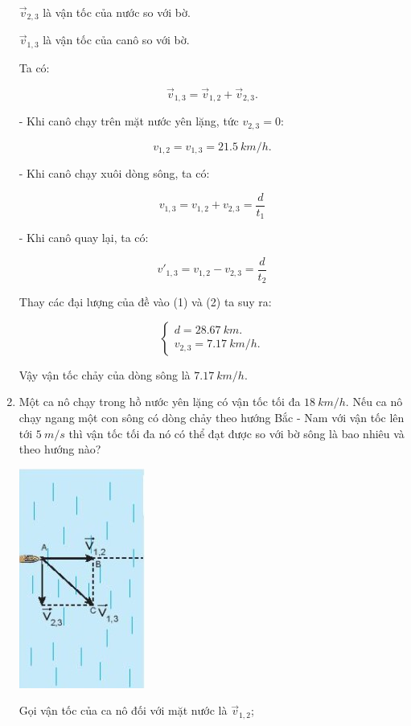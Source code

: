 \begin{enumerate}[label=\bfseries Bài \arabic*:,leftmargin=1.5cm]
{		
		$\vec v_{2,3}$ là vận tốc của nước so với bờ.
		
		
		$\vec v_{1,3}$ là vận tốc của canô so với bờ.
		
		Ta có:
		
		$$\vec v_{1,3} = \vec v_{1,2} + \vec v_{2,3}.$$
		
		- Khi canô chạy trên mặt nước yên lặng, tức $v_{2,3} = 0$:
		
		
		$$v_{1,2} = v_{1,3} = \SI{21,5}{km/h}.$$
		
		- Khi canô chạy xuôi dòng sông, ta có:
		
		$$v_{1,3} = v_{1,2} + v_{2,3} =\dfrac{d}{t_1}$$
		
		- Khi canô quay lại, ta có:
		
		$$v'_{1,3} = v_{1,2} - v_{2,3} =\dfrac{d}{t_2}$$
		
		Thay các đại lượng của đề vào (1) và (2) ta suy ra:
		
		$$\begin{cases}
			d = \SI{28,67}{km}.\\
			v_{2,3} = \SI{7,17}{km/h}.
		\end{cases}$$
		
		Vậy vận tốc chảy của dòng sông là $\SI{7,17}{km/h}$.
		
		
	}
	\item {}
	
	
	{
		Một ca nô chạy trong hồ nước yên lặng có vận tốc tối đa $\SI{18}{km/h}$. Nếu ca nô chạy ngang một con sông có dòng chảy theo hướng Bắc - Nam với vận tốc lên tới $\SI{5}{m/s}$ thì vận tốc tối đa nó có thể đạt được so với bờ sông là bao nhiêu và theo hướng nào?
	}
	\hideall
	{
		\begin{center}
			\includegraphics[scale=1]{../figs/VN10-2022-PH-TP005-4.jpg}
		\end{center}
		Gọi vận tốc của ca nô đối với mặt nước là $\vec v_{1,2}$; 
		
}
\end{enumerate}
